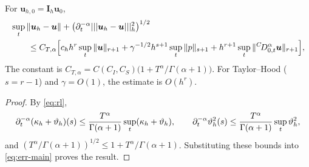 \begin{corollary}\label{cor:rate}
For $\bm u_{h,0}=\bm I_h\bm u_0$,
\[
\begin{aligned}
&\sup_t\|\bm u_h-\bm u\|+\bigl(\partial_t^{-\alpha}|||\bm u_h-\bm u|||_h^2\bigr)^{1/2}\\
&\qquad\le C_{T,\alpha}\Bigl[c_hh^r\sup_t\|\bm u\|_{r+1}+\gamma^{-1/2}h^{s+1}\sup_t\|p\|_{s+1}+h^{r+1}\sup_t\|{}^{C}\!D_{0,t}^{\alpha}\bm u\|_{r+1}\Bigr],
\end{aligned}
\]
The constant is $C_{T,\alpha}=C(C_I,C_S)\bigl(1+T^\alpha/\Gamma(\alpha+1)\bigr)$. For Taylor--Hood ($s=r-1$) and $\gamma=O(1)$, the estimate is $O(h^r)$.
\end{corollary}
\begin{proof}
By \eqref{eq:rl},
\[
\partial_t^{-\alpha}(\kappa_h+\vartheta_h)(s)\le\frac{T^\alpha}{\Gamma(\alpha+1)}\sup_t(\kappa_h+\vartheta_h),\qquad
\partial_t^{-\alpha}\vartheta_h^2(s)\le\frac{T^\alpha}{\Gamma(\alpha+1)}\sup_t\vartheta_h^2 ,
\]
and $(T^\alpha/\Gamma(\alpha+1))^{1/2}\le1+T^\alpha/\Gamma(\alpha+1)$. Substituting these bounds into \eqref{eq:err-main} proves the result.
\end{proof}


